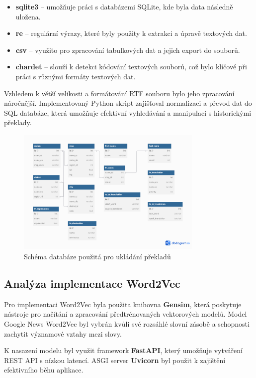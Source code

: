 \documentclass[czech, ba, kiv, he]{fasthesis}
\begin{document}
\begin{itemize}  
    \item \textbf{sqlite3} – umožňuje práci s databázemi SQLite, kde byla data následně uložena.  
    \item \textbf{re} – regulární výrazy, které byly použity k extrakci a úpravě textových dat.  
    \item \textbf{csv} – využito pro zpracování tabulkových dat a jejich export do souborů.  
    \item \textbf{chardet} – slouží k detekci kódování textových souborů, což bylo klíčové při práci s různými formáty textových dat.  
\end{itemize}  

Vzhledem k větší velikosti a formátování RTF souboru bylo jeho zpracování náročnější. Implementovaný Python skript zajišťoval normalizaci a převod dat do SQL databáze, která umožňuje efektivní vyhledávání a manipulaci s historickými překlady.  

\begin{figure}[h]  
    \centering  
    \includegraphics[width=0.8\textwidth]{database.png}  
    \caption{Schéma databáze použitá pro ukládání překladů}  
\end{figure}

\subsection{Analýza implementace Word2Vec}  

Pro implementaci Word2Vec byla použita knihovna \textbf{Gensim}, která poskytuje nástroje pro načítání a zpracování předtrénovaných vektorových modelů. Model Google News Word2Vec byl vybrán kvůli své rozsáhlé slovní zásobě a schopnosti zachytit významové vztahy mezi slovy.  

K nasazení modelu byl využit framework \textbf{FastAPI}, který umožňuje vytváření REST API s nízkou latencí. ASGI server \textbf{Uvicorn} byl použit k zajištění efektivního běhu aplikace. 
\end{document}
